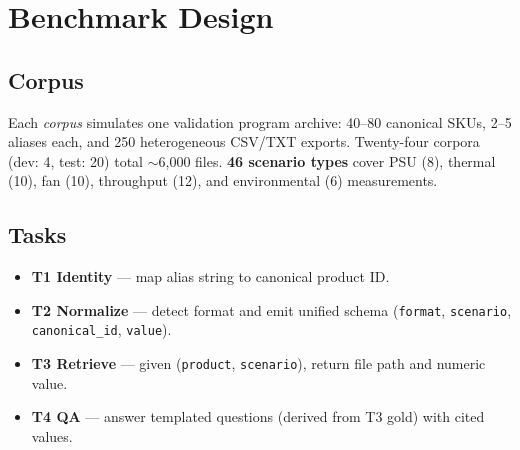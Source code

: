 \documentclass[conference]{IEEEtran}
\begin{document}
\begin{table}[t]
\centering
\caption{Differentiation vs.\ adjacent work}
\label{tab:diff}
\end{table}

\section{Benchmark Design}
\subsection{Corpus}
Each \emph{corpus} simulates one validation program archive: 40--80 canonical SKUs, 2--5 aliases each, and 250 heterogeneous CSV/TXT exports.
Twenty-four corpora (dev: 4, test: 20) total $\sim$6{,}000 files.
\textbf{46 scenario types} cover PSU (8), thermal (10), fan (10), throughput (12), and environmental (6) measurements.

\subsection{Tasks}
\begin{itemize}
  \item \textbf{T1 Identity} --- map alias string to canonical product ID.
  \item \textbf{T2 Normalize} --- detect format and emit unified schema (\texttt{format}, \texttt{scenario}, \texttt{canonical\_id}, \texttt{value}).
  \item \textbf{T3 Retrieve} --- given (\texttt{product}, \texttt{scenario}), return file path and numeric value.
  \item \textbf{T4 QA} --- answer templated questions (derived from T3 gold) with cited values.
\end{itemize}
\end{document}
